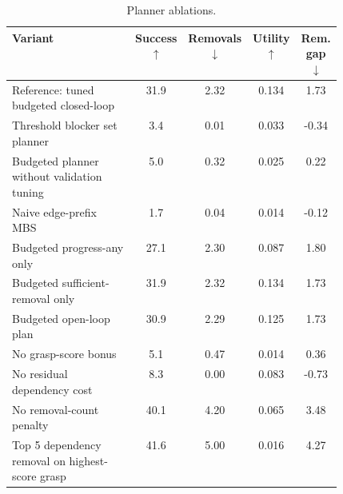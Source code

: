 \begin{table}[htbp]
  \centering
  \caption{Planner ablations.}
  \label{tab:stage3_planner_ablations}
  \small
  \setlength{\tabcolsep}{4.5pt}
  \begin{tabular}{>{\centering\arraybackslash}p{0.48\linewidth}cccc}
    \toprule
    Variant & Success $\uparrow$ & Removals $\downarrow$ & Utility $\uparrow$ & Rem. gap $\downarrow$ \\
    \midrule
    Reference: tuned budgeted closed-loop & 31.9 & 2.32 & 0.134 & 1.73 \\
    Threshold blocker set planner & 3.4 & 0.01 & 0.033 & -0.34 \\
    Budgeted planner without validation tuning & 5.0 & 0.32 & 0.025 & 0.22 \\
    Naive edge-prefix MBS & 1.7 & 0.04 & 0.014 & -0.12 \\
    Budgeted progress-any only & 27.1 & 2.30 & 0.087 & 1.80 \\
    Budgeted sufficient-removal only & 31.9 & 2.32 & 0.134 & 1.73 \\
    Budgeted open-loop plan & 30.9 & 2.29 & 0.125 & 1.73 \\
    No grasp-score bonus & 5.1 & 0.47 & 0.014 & 0.36 \\
    No residual dependency cost & 8.3 & 0.00 & 0.083 & -0.73 \\
    No removal-count penalty & 40.1 & 4.20 & 0.065 & 3.48 \\
    Top 5 dependency removal on highest-score grasp & 41.6 & 5.00 & 0.016 & 4.27 \\
    \bottomrule
  \end{tabular}
\end{table}
